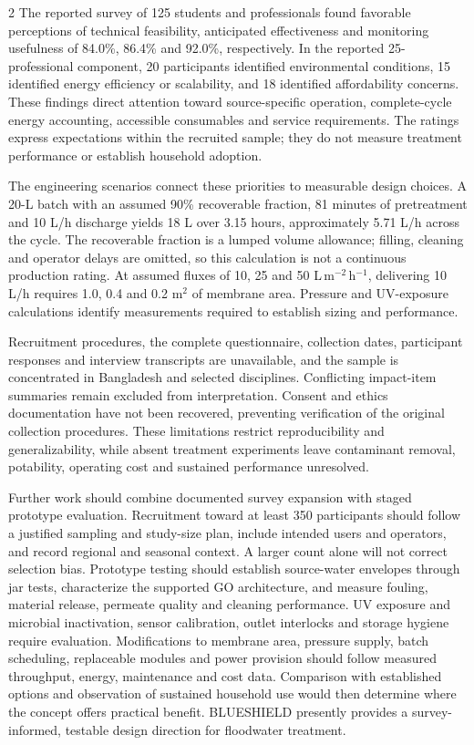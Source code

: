 \documentclass{ieeeaccess}
\begin{document}
\begin{multicols}{2}
The reported survey of 125 students and professionals found favorable perceptions of technical feasibility, anticipated effectiveness and monitoring usefulness of 84.0\%, 86.4\% and 92.0\%, respectively. In the reported 25-professional component, 20 participants identified environmental conditions, 15 identified energy efficiency or scalability, and 18 identified affordability concerns. These findings direct attention toward source-specific operation, complete-cycle energy accounting, accessible consumables and service requirements. The ratings express expectations within the recruited sample; they do not measure treatment performance or establish household adoption.

The engineering scenarios connect these priorities to measurable design choices. A 20-L batch with an assumed 90\% recoverable fraction, 81 minutes of pretreatment and 10 L/h discharge yields 18 L over 3.15 hours, approximately 5.71 L/h across the cycle. The recoverable fraction is a lumped volume allowance; filling, cleaning and operator delays are omitted, so this calculation is not a continuous production rating. At assumed fluxes of 10, 25 and 50 L\,m$^{-2}$\,h$^{-1}$, delivering 10 L/h requires 1.0, 0.4 and 0.2 m$^2$ of membrane area. Pressure and UV-exposure calculations identify measurements required to establish sizing and performance.

Recruitment procedures, the complete questionnaire, collection dates, participant responses and interview transcripts are unavailable, and the sample is concentrated in Bangladesh and selected disciplines. Conflicting impact-item summaries remain excluded from interpretation. Consent and ethics documentation have not been recovered, preventing verification of the original collection procedures. These limitations restrict reproducibility and generalizability, while absent treatment experiments leave contaminant removal, potability, operating cost and sustained performance unresolved.

Further work should combine documented survey expansion with staged prototype evaluation. Recruitment toward at least 350 participants should follow a justified sampling and study-size plan, include intended users and operators, and record regional and seasonal context. A larger count alone will not correct selection bias. Prototype testing should establish source-water envelopes through jar tests, characterize the supported GO architecture, and measure fouling, material release, permeate quality and cleaning performance. UV exposure and microbial inactivation, sensor calibration, outlet interlocks and storage hygiene require evaluation. Modifications to membrane area, pressure supply, batch scheduling, replaceable modules and power provision should follow measured throughput, energy, maintenance and cost data. Comparison with established options and observation of sustained household use would then determine where the concept offers practical benefit. BLUESHIELD presently provides a survey-informed, testable design direction for floodwater treatment.



\end{multicols}
\end{document}
